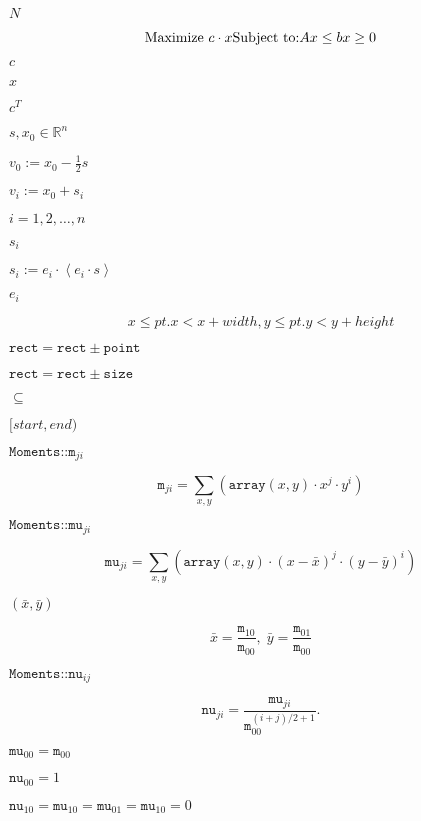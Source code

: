 \documentclass{article}
\begin{document}
$N$
\pagebreak

\[\mbox{Maximize } c\cdot x\\ \mbox{Subject to:}\\ Ax\leq b\\ x\geq 0\]
\pagebreak

$c$
\pagebreak

$x$
\pagebreak

$c^T$
\pagebreak

$s,x_0\in\mathbb{R}^n$
\pagebreak

$v_0:=x_0-\frac{1}{2} s$
\pagebreak

$v_i:=x_0+s_i$
\pagebreak

$i=1,2,\dots,n$
\pagebreak

$s_i$
\pagebreak

$s_i:=e_i\cdot\left<e_i\cdot s\right>$
\pagebreak

$e_i$
\pagebreak

\[x \leq pt.x < x+width, y \leq pt.y < y+height\]
\pagebreak

$\texttt{rect} = \texttt{rect} \pm \texttt{point}$
\pagebreak

$\texttt{rect} = \texttt{rect} \pm \texttt{size}$
\pagebreak

$\subseteq$
\pagebreak

$[start,end)$
\pagebreak

$\texttt{Moments::m}_{ji}$
\pagebreak

\[\texttt{m} _{ji}= \sum _{x,y} \left ( \texttt{array} (x,y) \cdot x^j \cdot y^i \right )\]
\pagebreak

$\texttt{Moments::mu}_{ji}$
\pagebreak

\[\texttt{mu} _{ji}= \sum _{x,y} \left ( \texttt{array} (x,y) \cdot (x - \bar{x} )^j \cdot (y - \bar{y} )^i \right )\]
\pagebreak

$(\bar{x}, \bar{y})$
\pagebreak

\[\bar{x} = \frac{\texttt{m}_{10}}{\texttt{m}_{00}} , \; \bar{y} = \frac{\texttt{m}_{01}}{\texttt{m}_{00}}\]
\pagebreak

$\texttt{Moments::nu}_{ij}$
\pagebreak

\[\texttt{nu} _{ji}= \frac{\texttt{mu}_{ji}}{\texttt{m}_{00}^{(i+j)/2+1}} .\]
\pagebreak

$\texttt{mu}_{00}=\texttt{m}_{00}$
\pagebreak

$\texttt{nu}_{00}=1$
\pagebreak

$\texttt{nu}_{10}=\texttt{mu}_{10}=\texttt{mu}_{01}=\texttt{mu}_{10}=0$
\pagebreak
\end{document}
